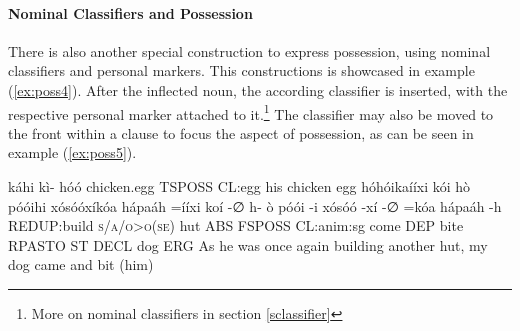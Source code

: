 \documentclass[a4paper, 12pt, oneside]{memoir}
\begin{document}
\paragraph{Nominal Classifiers and Possession}\label{snomclassifiersandpossession}
There is also another special construction to express possession, using nominal classifiers and personal markers. This constructions is showcased in example (\ref{ex:poss4}). After the inflected noun, the according classifier is inserted, with the respective personal marker attached to it.\footnote{More on nominal classifiers in section \ref{sclassifier}} 
The classifier may also be moved to the front within a clause to focus the aspect of possession, as can be seen in example (\ref{ex:poss5}).
\begin{examples}
\ex
\label{ex:poss4}
\bits káhi kì- hóó
\gloss chicken.egg TSPOSS CL:egg  
\tr his chicken egg
\ex
\label{ex:poss5}
\words hóhóikaííxi kói hò póóihi xósóóxíkóa hápaáh
 =ííxi koí -∅ h- ò póói -i xósóó -xí -∅ =kóa hápaáh -h 
\gloss REDUP:build \textsc{\textup{s/a/o>o(se)}} hut ABS FSPOSS CL:anim:sg come DEP bite RPASTO ST DECL dog ERG 
\tr As he was once again building another hut, my dog came and bit (him)
\end{examples}
\end{document}
